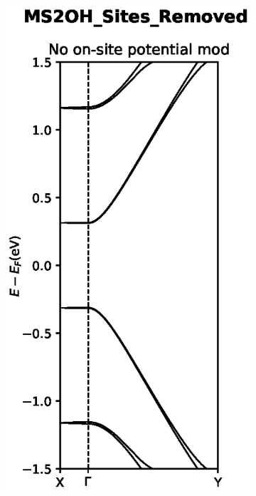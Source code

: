 \begin{figure}[h]
\begin{subfigure}[b]{0.3\textwidth}
		\vspace{-1.5\baselineskip}
		\caption{}
		\label{MS2OHDFT}
	\end{subfigure}
	\hspace{5pt}
	\begin{subfigure}[b]{0.3\textwidth}
		\centering
		\includegraphics[width=\textwidth]{Figures/MS2OH_Sites_Removed.eps}

\end{subfigure}
\end{figure}
